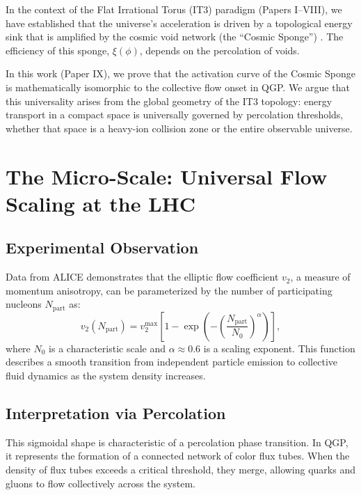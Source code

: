 \documentclass[12pt,a4paper]{article}
\begin{document}
In the context of the Flat Irrational Torus (IT3) paradigm (Papers I--VIII), we have established that the universe's acceleration is driven by a topological energy sink that is amplified by the cosmic void network (the ``Cosmic Sponge'') \citep{Logvinovich2026c, Logvinovich2026d}. The efficiency of this sponge, $\xi(\phi)$, depends on the percolation of voids.

In this work (Paper IX), we prove that the activation curve of the Cosmic Sponge is mathematically isomorphic to the collective flow onset in QGP. We argue that this universality arises from the global geometry of the IT3 topology: energy transport in a compact space is universally governed by percolation thresholds, whether that space is a heavy-ion collision zone or the entire observable universe.

\section{The Micro-Scale: Universal Flow Scaling at the LHC}

\subsection{Experimental Observation}

Data from ALICE demonstrates that the elliptic flow coefficient $v_2$, a measure of momentum anisotropy, can be parameterized by the number of participating nucleons $N_{\mathrm{part}}$ as:
\begin{equation}
v_2(N_{\mathrm{part}}) = v_2^{\max} \left[ 1 - \exp\left( -\left(\frac{N_{\mathrm{part}}}{N_0}\right)^\alpha \right) \right],
\label{eq:alice_scaling}
\end{equation}
where $N_0$ is a characteristic scale and $\alpha \approx 0.6$ is a scaling exponent. This function describes a smooth transition from independent particle emission to collective fluid dynamics as the system density increases.

\subsection{Interpretation via Percolation}

This sigmoidal shape is characteristic of a percolation phase transition. In QGP, it represents the formation of a connected network of color flux tubes. When the density of flux tubes exceeds a critical threshold, they merge, allowing quarks and gluons to flow collectively across the system.
\end{document}
